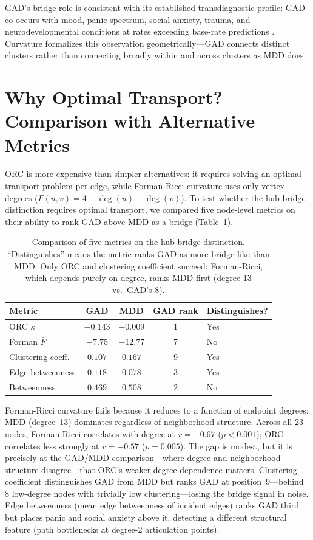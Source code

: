 \documentclass{article}
\begin{document}
GAD's bridge role is consistent with its established transdiagnostic profile: GAD co-occurs with mood, panic-spectrum, social anxiety, trauma, and neurodevelopmental conditions at rates exceeding base-rate predictions \citep{kessler2005prevalence, newman2013worry}. Curvature formalizes this observation geometrically---GAD connects distinct clusters rather than connecting broadly within and across clusters as MDD does.

\section{Why Optimal Transport? Comparison with Alternative Metrics}
\label{sec:comparison}

ORC is more expensive than simpler alternatives: it requires solving an optimal transport problem per edge, while Forman-Ricci curvature \citep{forman2003bochner} uses only vertex degrees ($F(u,v) = 4 - \deg(u) - \deg(v)$). To test whether the hub-bridge distinction requires optimal transport, we compared five node-level metrics on their ability to rank GAD above MDD as a bridge (Table~\ref{tab:comparison}).

\begin{table}[t]
\centering
\caption{Comparison of five metrics on the hub-bridge distinction. ``Distinguishes'' means the metric ranks GAD as more bridge-like than MDD. Only ORC and clustering coefficient succeed; Forman-Ricci, which depends purely on degree, ranks MDD first (degree 13 vs.\ GAD's 8).}
\label{tab:comparison}
\begin{tabular}{lcccl}
\toprule
Metric & GAD & MDD & GAD rank & Distinguishes? \\
\midrule
ORC $\bar\kappa$ & $-0.143$ & $-0.009$ & 1 & Yes \\
Forman $\bar{F}$ & $-7.75$ & $-12.77$ & 7 & No \\
Clustering coeff.\ & $0.107$ & $0.167$ & 9 & Yes \\
Edge betweenness & $0.118$ & $0.078$ & 3 & Yes \\
Betweenness & $0.469$ & $0.508$ & 2 & No \\
\bottomrule
\end{tabular}
\end{table}

Forman-Ricci curvature fails because it reduces to a function of endpoint degrees: MDD (degree~13) dominates regardless of neighborhood structure. Across all 23 nodes, Forman-Ricci correlates with degree at $r = -0.67$ ($p < 0.001$); ORC correlates less strongly at $r = -0.57$ ($p = 0.005$). The gap is modest, but it is precisely at the GAD/MDD comparison---where degree and neighborhood structure disagree---that ORC's weaker degree dependence matters. Clustering coefficient distinguishes GAD from MDD but ranks GAD at position~9---behind 8 low-degree nodes with trivially low clustering---losing the bridge signal in noise. Edge betweenness (mean edge betweenness of incident edges) ranks GAD third but places panic and social anxiety above it, detecting a different structural feature (path bottlenecks at degree-2 articulation points).
\end{document}
